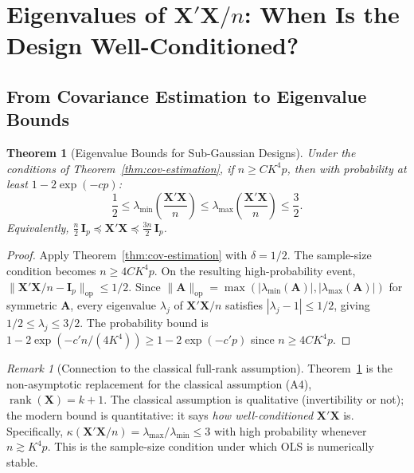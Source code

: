 \documentclass[14pt]{extarticle}
\theoremstyle{plain}
\newtheorem{theorem}{Theorem}[section]
\theoremstyle{definition}
\theoremstyle{remark}
\newtheorem*{remark}{Remark}
\DeclareMathOperator\rank{rank}
\newcommand{\bX}{\mathbf{X}}
\newcommand{\bI}{\mathbf{I}}
\newcommand{\bA}{\mathbf{A}}
\newcommand{\opnorm}[1]{\|#1\|_{\mathrm{op}}}
\begin{document}
\section{Eigenvalues of $\bX'\bX/n$: When Is the Design Well-Conditioned?}\label{sec:eigenvalues}

\subsection{From Covariance Estimation to Eigenvalue Bounds}

\begin{theorem}[Eigenvalue Bounds for Sub-Gaussian Designs]\label{thm:eigenvalue-bounds}
Under the conditions of Theorem~\ref{thm:cov-estimation}, if $n \geqslant CK^4 p$, then with probability at least $1 - 2\exp(-cp)$:
\begin{equation}\label{eq:eigenvalue-bounds}
\boxed{\frac{1}{2} \leqslant \lambda_{\min}\!\left(\frac{\bX'\bX}{n}\right) \leqslant \lambda_{\max}\!\left(\frac{\bX'\bX}{n}\right) \leqslant \frac{3}{2}.}
\end{equation}
Equivalently, $\frac{n}{2}\,\bI_p \preceq \bX'\bX \preceq \frac{3n}{2}\,\bI_p$.
\end{theorem}

\begin{proof}
Apply Theorem~\ref{thm:cov-estimation} with $\delta = 1/2$. The sample-size condition becomes $n \geqslant 4CK^4 p$. On the resulting high-probability event, $\opnorm{\bX'\bX/n - \bI_p} \leqslant 1/2$. Since $\opnorm{\bA} = \max(|\lambda_{\min}(\bA)|, |\lambda_{\max}(\bA)|)$ for symmetric $\bA$, every eigenvalue $\lambda_j$ of $\bX'\bX/n$ satisfies $|\lambda_j - 1| \leqslant 1/2$, giving $1/2 \leqslant \lambda_j \leqslant 3/2$. The probability bound is $1 - 2\exp(-c'n/(4K^4)) \geqslant 1 - 2\exp(-c'p)$ since $n \geqslant 4CK^4p$.
\end{proof}

\begin{remark}[Connection to the classical full-rank assumption]
Theorem~\ref{thm:eigenvalue-bounds} is the non-asymptotic replacement for the classical assumption (A4), $\rank(\bX) = k+1$. The classical assumption is qualitative (invertibility or not); the modern bound is quantitative: it says \emph{how well-conditioned} $\bX'\bX$ is. Specifically, $\kappa(\bX'\bX/n) = \lambda_{\max}/\lambda_{\min} \leqslant 3$ with high probability whenever $n \gtrsim K^4 p$. This is the sample-size condition under which OLS is numerically stable.
\end{remark}
\end{document}
